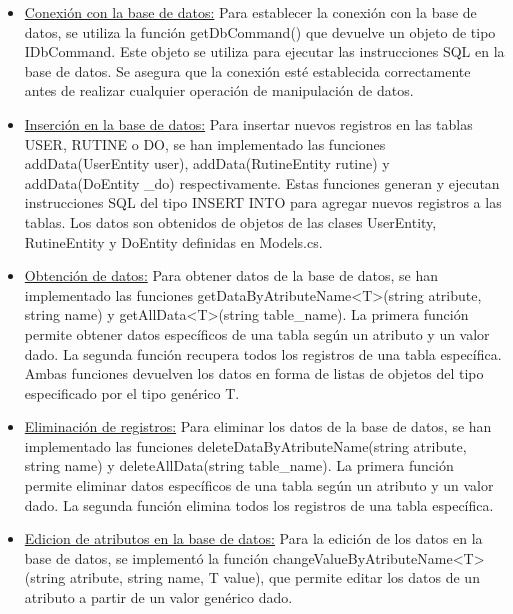 \begin{itemize}
    \item \underline{Conexión con la base de datos:} Para establecer la conexión con la base de datos, se utiliza la función getDbCommand() que devuelve un objeto de tipo IDbCommand. Este objeto se utiliza para ejecutar las instrucciones SQL en la base de datos. Se asegura que la conexión esté establecida correctamente antes de realizar cualquier operación de manipulación de datos.
    
    \item \underline{Inserción en la base de datos:} Para insertar nuevos registros en las tablas USER, RUTINE o DO, se han implementado las funciones addData(UserEntity user), addData(RutineEntity rutine) y addData(DoEntity \_do) respectivamente. Estas funciones generan y ejecutan instrucciones SQL del tipo INSERT INTO para agregar nuevos registros a las tablas. Los datos son obtenidos de objetos de las clases UserEntity, RutineEntity y DoEntity definidas en Models.cs.

    \item \underline{Obtención de datos:} Para obtener datos de la base de datos, se han implementado las funciones getDataByAtributeName<T>(string atribute, string name) y getAllData<T>(string table\_name). La primera función permite obtener datos específicos de una tabla según un atributo y un valor dado. La segunda función recupera todos los registros de una tabla específica. Ambas funciones devuelven los datos en forma de listas de objetos del tipo especificado por el tipo genérico T.

    \item \underline{Eliminación de registros:} Para eliminar los datos de la base de datos, se han implementado las funciones deleteDataByAtributeName(string atribute, string name) y deleteAllData(string table\_name). La primera función permite eliminar datos específicos de una tabla según un atributo y un valor dado. La segunda función elimina todos los registros de una tabla específica.

    \item \underline{Edicion de atributos en la base de datos:} Para la edición de los datos en la base de datos, se implementó la función changeValueByAtributeName<T>(string atribute, string name, T value), que permite editar los datos de un atributo a partir de un valor genérico dado.
\end{itemize}